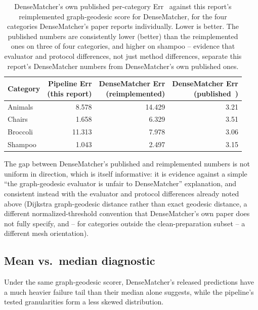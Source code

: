 \documentclass{article}
\begin{document}
\begin{table}[H]
\centering
\small
\begin{tabular}{lrrr}
\toprule
Category & \shortstack{Pipeline Err\\(this report)} & \shortstack{DenseMatcher Err\\(reimplemented)} & \shortstack{DenseMatcher Err\\(published~\cite{densematcher})} \\
\midrule
Animals & 8.578 & 14.429 & 3.21 \\
Chairs & 1.658 & 6.329 & 3.51 \\
Broccoli & 11.313 & 7.978 & 3.06 \\
Shampoo & 1.043 & 2.497 & 3.15 \\
\bottomrule
\end{tabular}
\caption{DenseMatcher's own published per-category Err~\cite{densematcher} against this report's
reimplemented graph-geodesic score for DenseMatcher, for the four categories DenseMatcher's paper
reports individually. Lower is better. The published numbers are consistently lower (better) than
the reimplemented ones on three of four categories, and higher on shampoo -- evidence that evaluator
and protocol differences, not just method differences, separate this report's DenseMatcher numbers
from DenseMatcher's own published ones.}
\label{tab:densematcher-published}
\end{table}

The gap between DenseMatcher's published and reimplemented numbers is not uniform in direction,
which is itself informative: it is evidence against a simple ``the graph-geodesic evaluator is
unfair to DenseMatcher'' explanation, and consistent instead with the evaluator and protocol
differences already noted above (Dijkstra graph-geodesic distance rather than exact geodesic
distance, a different normalized-threshold convention that DenseMatcher's own paper does not fully
specify, and -- for categories outside the clean-preparation subset -- a different mesh
orientation).

\subsection{Mean vs.\ median diagnostic}

Under the same graph-geodesic scorer, DenseMatcher's released predictions have
a much heavier failure tail than their median alone suggests, while the pipeline's tested
granularities form a less skewed distribution.
\end{document}
